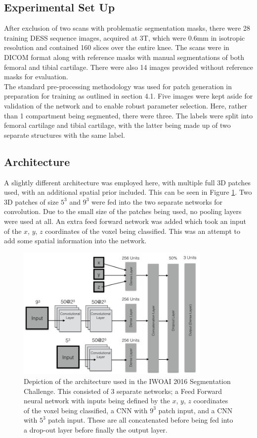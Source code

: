 \documentclass[11pt,a4paper]{memoir}
\numberwithin{figure}{section}
\numberwithin{table}{section}
\numberwithin{equation}{section}
\begin{document}
\subsection{Experimental Set Up}
After exclusion of two scans with problematic segmentation masks, there were 28 training DESS sequence images, acquired at 3T, which were 0.6mm in isotropic resolution and contained 160 slices over the entire knee. The scans were in DICOM format  along with reference masks with manual segmentations of both femoral and tibial cartilage. There were also 14 images provided without reference masks for evaluation. \\

The standard pre-processing methodology was used for patch generation in preparation for training as outlined in section 4.1. Five images were kept aside for validation of the network and to enable robust parameter selection. Here, rather than 1 compartment being segmented, there were three. The labels were split into femoral cartilage and tibial cartilage, with the latter being made up of two separate structures with the same label.

\subsection{Architecture}
A slightly different architecture was employed here, with multiple full 3D patches used, with an additional spatial prior included. This can be seen in Figure \ref{challenge arch}. Two 3D patches of size $5^3$ and $9^3$ were fed into the two separate networks for convolution. Due to the small size of the patches being used, no pooling layers were used at all. An extra feed forward network was added which took an input of the $x$, $y$, $z$ coordinates of the voxel being classified. This was an attempt to add some spatial information into the network. \\


\begin{figure}[!h]
\centering
\includegraphics[height = 6.5cm]{arch2.jpg}
\caption[An overview of the architecture used in the IWOAI Segmentation Challenge]{Depiction of the architecture used in the IWOAI 2016 Segmentation Challenge. This consisted of 3 separate networks; a Feed Forward neural network with inputs being defined by the $x$, $y$, $z$ coordinates of the voxel being classified, a CNN with $9^3$ patch input, and a CNN with $5^3$ patch input. These are all concatenated before being fed into a drop-out layer before finally the output layer.}
\label{challenge arch}
\end{figure}
\end{document}
